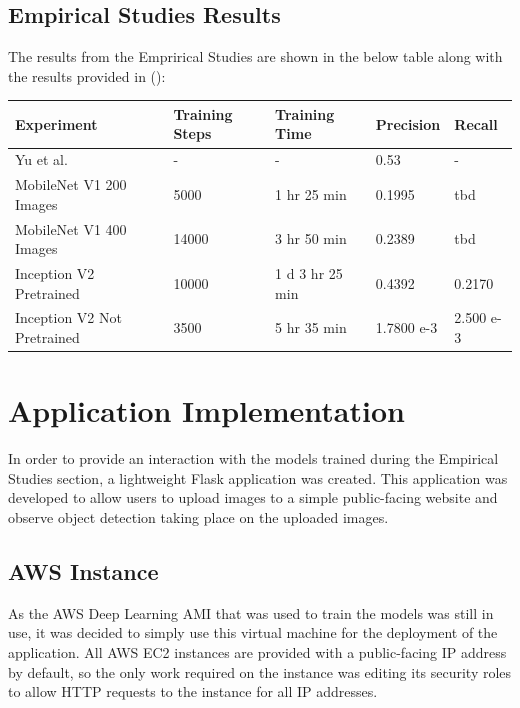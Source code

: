 \documentclass[12pt]{report}
\begin{document}
\newpage
\section{Empirical Studies Results}
\begin{flushleft}
The results from the Emprirical Studies are shown in the below table along with the results provided in (\cite{yu2018bdd100k}):
\end{flushleft}

\begin{tabular}{|l|l|l|l|l|}
\hline
Experiment                  & Training Steps & Training Time   & Precision  & Recall    \\ \hline
Yu et al.                   & -              & -               & 0.53       & -         \\ \hline
MobileNet V1 200 Images     & 5000           & 1 hr 25 min     & 0.1995     & tbd       \\ \hline
MobileNet V1 400 Images     & 14000          & 3 hr 50 min     & 0.2389     & tbd       \\ \hline
Inception V2 Pretrained     & 10000          & 1 d 3 hr 25 min & 0.4392     & 0.2170    \\ \hline
Inception V2 Not Pretrained & 3500           & 5 hr 35 min     & 1.7800 e-3 & 2.500 e-3 \\ \hline
\end{tabular}

\newpage
\chapter{Application Implementation}
\begin{flushleft}
In order to provide an interaction with the models trained during the Empirical Studies section, a lightweight Flask application was created. This application was developed to allow users to upload images to a simple public-facing website and observe object detection taking place on the uploaded images.
\end{flushleft}

\section{AWS Instance}
\begin{flushleft}
As the AWS Deep Learning AMI that was used to train the models was still in use, it was decided to simply use this virtual machine for the deployment of the application. All AWS EC2 instances are provided with a public-facing IP address by default, so the only work required on the instance was editing its security roles to allow HTTP requests to the instance for all IP addresses.
\end{flushleft}
\end{document}
